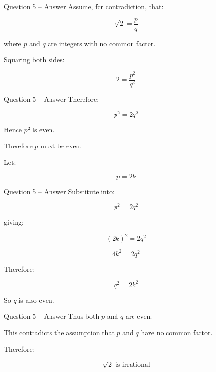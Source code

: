 \begin{frame}{Question 5 -- Answer}
Assume, for contradiction, that:

$$
\sqrt{2}=\frac{p}{q}
$$

where $p$ and $q$ are integers with no common factor.

Squaring both sides:

$$
2=\frac{p^2}{q^2}
$$

\end{frame}

\begin{frame}{Question 5 -- Answer}
Therefore:

$$
p^2=2q^2
$$

Hence $p^2$ is even.

Therefore $p$ must be even.

Let:

$$
p=2k
$$

\end{frame}

\begin{frame}{Question 5 -- Answer}
Substitute into:

$$
p^2=2q^2
$$

giving:

$$
(2k)^2=2q^2
$$

$$
4k^2=2q^2
$$

Therefore:

$$
q^2=2k^2
$$

So $q$ is also even.
\end{frame}

\begin{frame}{Question 5 -- Answer}
Thus both $p$ and $q$ are even.

This contradicts the assumption that $p$ and $q$ have no common factor.

Therefore:

$$
\boxed{\sqrt{2}\text{ is irrational}}
$$

\end{frame}
